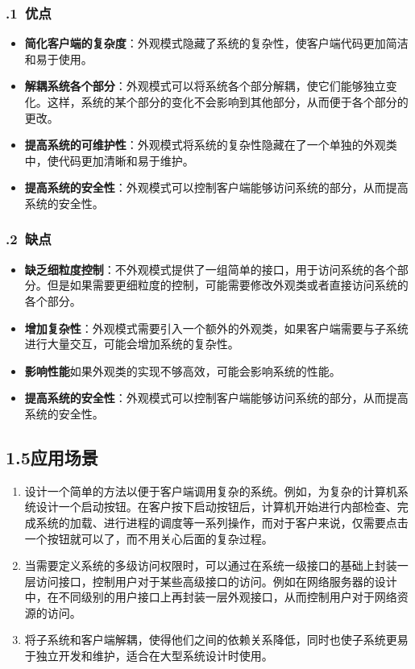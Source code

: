 \documentclass[24pt,a4paper]{article}%
\begin{document}
\subsubsection*{.1\ 优点}
\begin{itemize}
    \item \textbf{简化客户端的复杂度}：外观模式隐藏了系统的复杂性，使客户端代码更加简洁和易于使用。
    \item \textbf{解耦系统各个部分}：外观模式可以将系统各个部分解耦，使它们能够独立变化。这样，系统的某个部分的变化不会影响到其他部分，从而便于各个部分的更改。
    \item \textbf{提高系统的可维护性}：外观模式将系统的复杂性隐藏在了一个单独的外观类中，使代码更加清晰和易于维护。
    \item \textbf{提高系统的安全性}：外观模式可以控制客户端能够访问系统的部分，从而提高系统的安全性。
\end{itemize}

\subsubsection*{.2\ 缺点}
\begin{itemize}
    \item \textbf{缺乏细粒度控制}：不外观模式提供了一组简单的接口，用于访问系统的各个部分。但是如果需要更细粒度的控制，可能需要修改外观类或者直接访问系统的各个部分。
    \item \textbf{增加复杂性}：外观模式需要引入一个额外的外观类，如果客户端需要与子系统进行大量交互，可能会增加系统的复杂性。
    \item \textbf{影响性能}如果外观类的实现不够高效，可能会影响系统的性能。
    \item \textbf{提高系统的安全性}：外观模式可以控制客户端能够访问系统的部分，从而提高系统的安全性。
\end{itemize}

\subsection*{\songti 1.5应用场景}
\begin{enumerate}
    \item 设计一个简单的方法以便于客户端调用复杂的系统。例如，为复杂的计算机系统设计一个启动按钮。在客户按下启动按钮后，计算机开始进行内部检查、完成系统的加载、进行进程的调度等一系列操作，而对于客户来说，仅需要点击一个按钮就可以了，而不用关心后面的复杂过程。
    \item 当需要定义系统的多级访问权限时，可以通过在系统一级接口的基础上封装一层访问接口，控制用户对于某些高级接口的访问。例如在网络服务器的设计中，在不同级别的用户接口上再封装一层外观接口，从而控制用户对于网络资源的访问。
    \item 将子系统和客户端解耦，使得他们之间的依赖关系降低，同时也使子系统更易于独立开发和维护，适合在大型系统设计时使用。
\end{enumerate}
\end{document}
